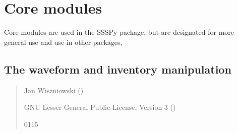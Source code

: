 \documentclass[letterpaper,10pt,english]{sphinxmanual}
\begin{document}
\sphinxstepscope


\section{Core modules}
\label{\detokenize{api_core:core-modules}}\label{\detokenize{api_core::doc}}
\sphinxAtStartPar
Core modules are used in the SSSPy package,
but are designated for more general use and use in other packages,

\subsection{The waveform and inventory manipulation}
\label{\detokenize{api_core:the-waveform-and-inventory-manipulation}}\label{\detokenize{api_core:module-core.signal_utils}}\begin{quote}\begin{description}
\sphinxAtStartPar
Jan Wiszniowski ()

\sphinxAtStartPar
GNU Lesser General Public License, Version 3
()

\sphinxhyphen{}01\sphinxhyphen{}15

\end{description}\end{quote}
\end{document}
